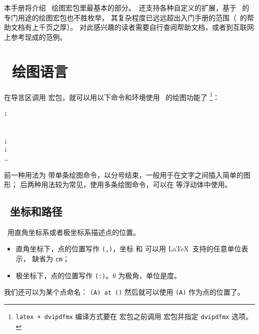 本手册将介绍 \TikZ\ 绘图宏包里最基本的部分。\TikZ\ 还支持各种自定义的扩展，基于 \TikZ\ 的专门用途的绘图宏包也不胜枚举，
其复杂程度已远远超出入门手册的范围（\TikZ\ 的帮助文档有上千页之厚）。
对此感兴趣的读者需要自行查阅帮助文档，或者到互联网上参考现成的范例。

\section{\TikZ\ 绘图语言}\label{sec:tikz}

在导言区调用  宏包，就可以用以下命令和环境使用 \TikZ\ 的绘图功能了%
\footnote{\texttt{latex + dvipdfmx} 编译方式要在  宏包之前调用  宏包并指定 \texttt{dvipdfmx} 选项。}：
\begin{command}
\oarg*{\ldots} \texttt{;} \\[1ex]
\oarg*{\ldots}  \\[1ex]
\oarg*{\ldots} \\
\texttt{;} \\
\texttt{;} \\
\ldots \\
\end{command}

前一种用法为  带单条绘图命令，以分号结束，一般用于在文字之间插入简单的图形；
后两种用法较为常见，使用多条绘图命令，可以在  等浮动体中使用。

\subsection{\TikZ\ 坐标和路径}\label{subsec:tikz-path}

\TikZ\ 用直角坐标系或者极坐标系描述点的位置。
\begin{itemize}
  \item 直角坐标下，点的位置写作 \texttt{(,)}，坐标  和  可以用 \LaTeX\ 支持的任意单位表示，
  缺省为 \texttt{cm}；
  \item 极坐标下，点的位置写作 \texttt{(\Arg{$\theta$}:)}。$\theta$ 为极角，单位是度。
\end{itemize}

我们还可以为某个点命名： \texttt{(A) at ()} 
然后就可以使用 \texttt{(A)} 作为点的位置了。

